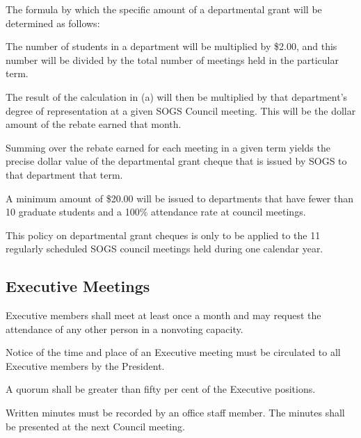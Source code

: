 \begin{longenum}[ label*=\thesubsection.\arabic*., align=left]
    \item The formula by which the specific amount of a departmental grant will be determined as follows:
	\begin{longenum}[ label*=\arabic*., align=left]
		\item The number of students in a department will be multiplied by \$2.00, and this number will be divided by the total number of meetings held in the particular term. 		
        \item The result of the calculation in (a) will then be multiplied by that department's degree of representation at a given SOGS Council meeting. This will be the dollar amount of the rebate earned that month.
        \item Summing over the rebate earned for each meeting in a given term yields the precise dollar value of the departmental grant cheque that is issued by SOGS to that department that term.
    \end{longenum} 
    \item A minimum amount of \$20.00 will be issued to departments that have fewer than 10 graduate students and a 100\% attendance rate at council meetings.
    \item This policy on departmental grant cheques is only to be applied to the 11 regularly scheduled SOGS council meetings held during one calendar year.
\end{longenum}
\subsection{Executive Meetings}
\begin{longenum}[ label*=\thesubsection.\arabic*., align=left]
	\item Executive members shall meet at least once a month and may request the attendance of any other person in a nonvoting capacity. 
    \item Notice of the time and place of an Executive meeting must be circulated to all Executive members by the President.
    \item A quorum shall be greater than fifty per cent of the Executive positions.
    \item Written minutes must be recorded by an office staff member. The minutes shall be presented at the next Council meeting.
\end{longenum}
\newpage

